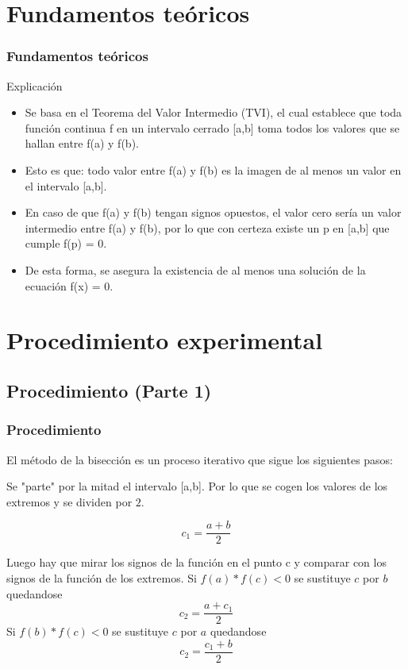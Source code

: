 \documentclass{beamer}
\begin{document}
\section{Fundamentos teóricos}
\begin{frame}

\frametitle{Fundamentos teóricos}

\begin{block}{Explicación}
  \begin{itemize}
  \item
    Se basa en el Teorema del Valor Intermedio (TVI), el cual establece que toda función continua f en un intervalo cerrado [a,b] toma todos los valores que se hallan entre f(a) y f(b). 
  \pause

  \item
    Esto es que: todo valor entre f(a) y f(b) es la imagen de al menos un valor en el intervalo [a,b]. 
  \pause

  \item
    En caso de que f(a) y f(b) tengan signos opuestos, el valor cero sería un valor intermedio entre f(a) y f(b), por lo que con certeza existe un p en [a,b] que cumple f(p) = 0. 
  \pause

  \item
    De esta forma, se asegura la existencia de al menos una solución de la ecuación f(x) = 0.
  \end{itemize}
\end{block}

\end{frame}


\section{Procedimiento experimental}

\subsection{Procedimiento (Parte 1)}
\begin{frame}
\frametitle{Procedimiento}
El método de la bisección es un proceso iterativo que sigue los siguientes pasos:
 \item
  Se "parte" por la mitad el intervalo [a,b]. Por lo que se cogen los valores de los extremos y se dividen por $2$.
  \begin{center}
   $$ c_1=\frac{a+b}{2} $$
  \end{center}
 \pause
 
 \item
  Luego hay que mirar los signos de la función en el punto c y comparar con los signos de la función de los extremos.
    \Item
     Si $f(a)*f(c)<0$ se sustituye $c$ por $b$ quedandose $$c_2=\frac{a+c_1}{2}$$
    \Item
     Si $f(b)*f(c)<0$ se sustituye $c$ por $a$ quedandose $$c_2=\frac{c_1+b}{2}$$
\end{frame}
\end{document}
